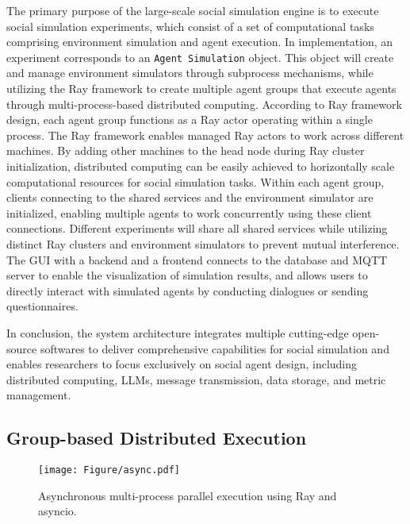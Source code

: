 The primary purpose of the large-scale social simulation engine is to execute social simulation experiments, which consist of a set of computational tasks comprising environment simulation and agent execution.
In implementation, an experiment corresponds to an \texttt{Agent Simulation} object. This object will create and manage environment simulators through subprocess mechanisms, while utilizing the Ray framework to create multiple agent groups that execute agents through multi-process-based distributed computing.
According to Ray framework design, each agent group functions as a Ray actor operating within a single process.
The Ray framework enables managed Ray actors to work across different machines.
By adding other machines to the head node during Ray cluster initialization, distributed computing can be easily achieved to horizontally scale computational resources for social simulation tasks.
Within each agent group, clients connecting to the shared services and the environment simulator are initialized, enabling multiple agents to work concurrently using these client connections.
Different experiments will share all shared services while utilizing distinct Ray clusters and environment simulators to prevent mutual interference.
The GUI with a backend and a frontend connects to the database and MQTT server to enable the visualization of simulation results, and allows users to directly interact with simulated agents by conducting dialogues or sending questionnaires.

In conclusion, the system architecture integrates multiple cutting-edge open-source softwares to deliver comprehensive capabilities for social simulation and enables researchers to focus exclusively on social agent design, including distributed computing, LLMs, message transmission, data storage, and metric management.

\subsection{Group-based Distributed Execution}\label{sec:sim:group}


\begin{figure}[ht]
\centering
\texttt{[image: Figure/async.pdf]}
\caption{Asynchronous multi-process parallel execution using Ray and asyncio.}
\label{fig:async}
\end{figure}


